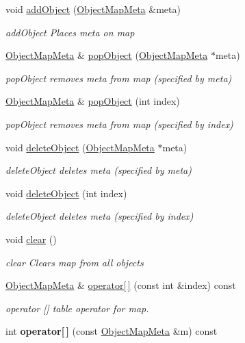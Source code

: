 \begin{DoxyCompactItemize}
void \hyperlink{classGameMap_a7ba7b031db20572304e9d1af751ead53}{add\+Object} (\hyperlink{classObjectMapMeta}{Object\+Map\+Meta} \&meta)
\begin{DoxyCompactList}\small\item\em add\+Object Places meta on map \end{DoxyCompactList}\item 
\hyperlink{classObjectMapMeta}{Object\+Map\+Meta} \& \hyperlink{classGameMap_a48e62c1eccddabdf34b01c23e17ad07a}{pop\+Object} (\hyperlink{classObjectMapMeta}{Object\+Map\+Meta} $\ast$meta)
\begin{DoxyCompactList}\small\item\em pop\+Object removes meta from map (specified by meta) \end{DoxyCompactList}\item 
\hyperlink{classObjectMapMeta}{Object\+Map\+Meta} \& \hyperlink{classGameMap_aae79574a7e15275ad8bff7aa1d109f32}{pop\+Object} (int index)
\begin{DoxyCompactList}\small\item\em pop\+Object removes meta from map (specified by index) \end{DoxyCompactList}\item 
void \hyperlink{classGameMap_ac0bec0f4d4de18a568b952b525e37ce4}{delete\+Object} (\hyperlink{classObjectMapMeta}{Object\+Map\+Meta} $\ast$meta)
\begin{DoxyCompactList}\small\item\em delete\+Object deletes meta (specified by meta) \end{DoxyCompactList}\item 
void \hyperlink{classGameMap_a0177ce70320072c9eaaf0a14f559ca8a}{delete\+Object} (int index)
\begin{DoxyCompactList}\small\item\em delete\+Object deletes meta (specified by index) \end{DoxyCompactList}\item 
\hypertarget{classGameMap_a27fe5bad0af175eb8bf65254262b96cf}{}void \hyperlink{classGameMap_a27fe5bad0af175eb8bf65254262b96cf}{clear} ()\label{classGameMap_a27fe5bad0af175eb8bf65254262b96cf}

\begin{DoxyCompactList}\small\item\em clear Clears map from all objects \end{DoxyCompactList}\item 
\hyperlink{classObjectMapMeta}{Object\+Map\+Meta} \& \hyperlink{classGameMap_af4ce25ca7060ef9a175f75075364d9c0}{operator\mbox{[}$\,$\mbox{]}} (const int \&index) const 
\begin{DoxyCompactList}\small\item\em operator \mbox{[}\mbox{]} table operator for map. \end{DoxyCompactList}\item 
\hypertarget{classGameMap_ac1001868696aa67e05070149376ea7d9}{}int {\bfseries operator\mbox{[}$\,$\mbox{]}} (const \hyperlink{classObjectMapMeta}{Object\+Map\+Meta} \&m) const \label{classGameMap_ac1001868696aa67e05070149376ea7d9}


\end{DoxyCompactItemize}
